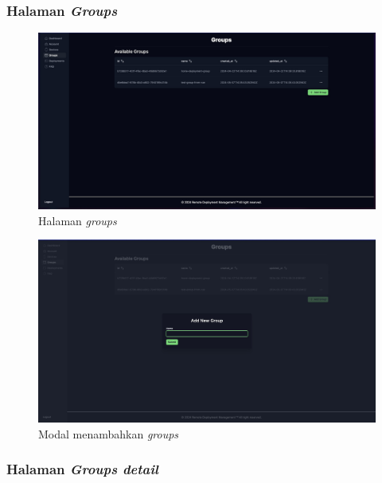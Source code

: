 \pagebreak

\subsubsection{Halaman \textit{Groups}}

\begin{figure}
  \centering
  \includegraphics[width=1\textwidth]{resources/chapter-4/dashboard/groups-page.jpg}
  \caption{Halaman \textit{groups}}
  \label{fig:halaman-groups}
\end{figure}

\begin{figure}
  \centering
  \includegraphics[width=1\textwidth]{resources/chapter-4/dashboard/groups-page-add.jpg}
  \caption{Modal menambahkan \textit{groups}}
  \label{fig:halaman-groups-add}
\end{figure}

\pagebreak

\subsubsection{Halaman \textit{Groups detail}}


